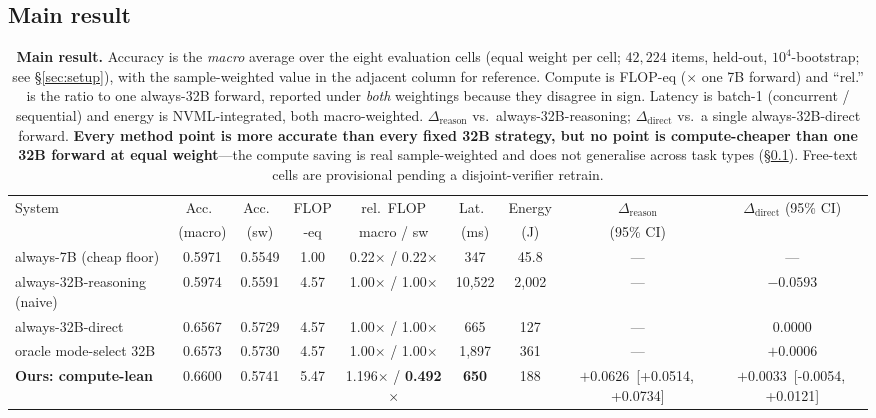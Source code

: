 \documentclass[conference]{IEEEtran}
\newcommand{\ci}[2]{{\footnotesize[#1,\,#2]}}
\begin{document}
\subsection{Main result}\label{sec:main}

\begin{table}[t]
\centering
\caption{\textbf{Main result.} Accuracy is the \emph{macro} average over the eight evaluation cells (equal weight per cell; $42{,}224$ items, held-out, $10^4$-bootstrap; see \S\ref{sec:setup}), with the sample-weighted value in the adjacent column for reference. Compute is FLOP-eq ($\times$ one 7B forward) and ``rel.'' is the ratio to one always-32B forward, reported under \emph{both} weightings because they disagree in sign. Latency is batch-1 (concurrent / sequential) and energy is NVML-integrated, both macro-weighted. $\Delta_{\text{reason}}$ vs.\ always-32B-reasoning; $\Delta_{\text{direct}}$ vs.\ a single always-32B-direct forward. \textbf{Every method point is more accurate than every fixed 32B strategy, but no point is compute-cheaper than one 32B forward at equal weight}---the compute saving is real sample-weighted and does not generalise across task types (\S\ref{sec:main}). Free-text cells are provisional pending a disjoint-verifier retrain.}
\label{tab:main}
\footnotesize
\setlength{\tabcolsep}{3.2pt}
\begin{tabular}{@{}lcccccccc@{}}
\toprule
System & Acc.\ & Acc.\ & FLOP & rel.\ FLOP & Lat.\ & Energy & $\Delta_{\text{reason}}$ & $\Delta_{\text{direct}}$ (95\% CI) \\
 & (macro) & (sw) & -eq & macro / sw & (ms) & (J) & (95\% CI) & \\
\midrule
always-7B (cheap floor)          & 0.5971 & 0.5549 & 1.00 & 0.22$\times$ / 0.22$\times$ & 347   & 45.8  & --- & --- \\
always-32B-reasoning (naive)     & 0.5974 & 0.5591 & 4.57 & 1.00$\times$ / 1.00$\times$ & 10{,}522 & 2{,}002 & --- & $-0.0593$ \\
always-32B-direct                & 0.6567 & 0.5729 & 4.57 & 1.00$\times$ / 1.00$\times$ & 665   & 127   & --- & $0.0000$ \\
oracle mode-select 32B           & 0.6573 & 0.5730 & 4.57 & 1.00$\times$ / 1.00$\times$ & 1{,}897 & 361 & --- & $+0.0006$ \\
\midrule
\textbf{Ours: compute-lean}      & 0.6600 & 0.5741 & 5.47 & 1.196$\times$ / \textbf{0.492$\times$} & \textbf{650} & 188 & $+0.0626$~\ci{+0.0514}{+0.0734} & $+0.0033$~\ci{-0.0054}{+0.0121} \\

\end{tabular}
\end{table}
\end{document}
